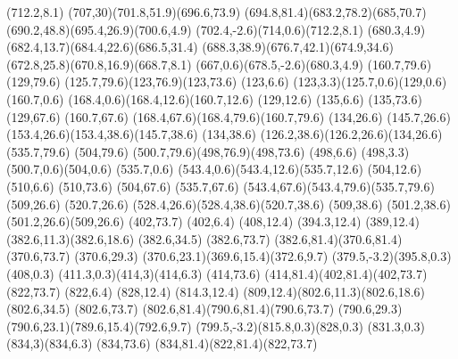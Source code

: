 {
{
\newpath
\moveto(712.2,8.1)
\curveto(707,30)(701.8,51.9)(696.6,73.9)
\curveto(694.8,81.4)(683.2,78.2)(685,70.7)
\curveto(690.2,48.8)(695.4,26.9)(700.6,4.9)
\curveto(702.4,-2.6)(714,0.6)(712.2,8.1)
}
}
{
{
\newpath
\moveto(680.3,4.9)
\curveto(682.4,13.7)(684.4,22.6)(686.5,31.4)
\curveto(688.3,38.9)(676.7,42.1)(674.9,34.6)
\curveto(672.8,25.8)(670.8,16.9)(668.7,8.1)
\curveto(667,0.6)(678.5,-2.6)(680.3,4.9)
}
}
{
{
\newpath
\moveto(160.7,79.6)
\lineto(129,79.6)
\curveto(125.7,79.6)(123,76.9)(123,73.6)
\lineto(123,6.6)
\curveto(123,3.3)(125.7,0.6)(129,0.6)
\lineto(160.7,0.6)
\curveto(168.4,0.6)(168.4,12.6)(160.7,12.6)
\lineto(129,12.6)
\lineto(135,6.6)
\lineto(135,73.6)
\lineto(129,67.6)
\lineto(160.7,67.6)
\curveto(168.4,67.6)(168.4,79.6)(160.7,79.6)
}
}
{
{
\newpath
\moveto(134,26.6)
\lineto(145.7,26.6)
\curveto(153.4,26.6)(153.4,38.6)(145.7,38.6)
\lineto(134,38.6)
\curveto(126.2,38.6)(126.2,26.6)(134,26.6)
}
}
{
{
\newpath
\moveto(535.7,79.6)
\lineto(504,79.6)
\curveto(500.7,79.6)(498,76.9)(498,73.6)
\lineto(498,6.6)
\curveto(498,3.3)(500.7,0.6)(504,0.6)
\lineto(535.7,0.6)
\curveto(543.4,0.6)(543.4,12.6)(535.7,12.6)
\lineto(504,12.6)
\lineto(510,6.6)
\lineto(510,73.6)
\lineto(504,67.6)
\lineto(535.7,67.6)
\curveto(543.4,67.6)(543.4,79.6)(535.7,79.6)
}
}
{
{
\newpath
\moveto(509,26.6)
\lineto(520.7,26.6)
\curveto(528.4,26.6)(528.4,38.6)(520.7,38.6)
\lineto(509,38.6)
\curveto(501.2,38.6)(501.2,26.6)(509,26.6)
}
}
{
{
\newpath
\moveto(402,73.7)
\lineto(402,6.4)
\lineto(408,12.4)
\lineto(394.3,12.4)
\curveto(389,12.4)(382.6,11.3)(382.6,18.6)
\lineto(382.6,34.5)
\lineto(382.6,73.7)
\curveto(382.6,81.4)(370.6,81.4)(370.6,73.7)
\lineto(370.6,29.3)
\curveto(370.6,23.1)(369.6,15.4)(372.6,9.7)
\curveto(379.5,-3.2)(395.8,0.3)(408,0.3)
\curveto(411.3,0.3)(414,3)(414,6.3)
\lineto(414,73.6)
\curveto(414,81.4)(402,81.4)(402,73.7)
}
}
{
{
\newpath
\moveto(822,73.7)
\lineto(822,6.4)
\lineto(828,12.4)
\lineto(814.3,12.4)
\curveto(809,12.4)(802.6,11.3)(802.6,18.6)
\lineto(802.6,34.5)
\lineto(802.6,73.7)
\curveto(802.6,81.4)(790.6,81.4)(790.6,73.7)
\lineto(790.6,29.3)
\curveto(790.6,23.1)(789.6,15.4)(792.6,9.7)
\curveto(799.5,-3.2)(815.8,0.3)(828,0.3)
\curveto(831.3,0.3)(834,3)(834,6.3)
\lineto(834,73.6)
\curveto(834,81.4)(822,81.4)(822,73.7)
}
}
